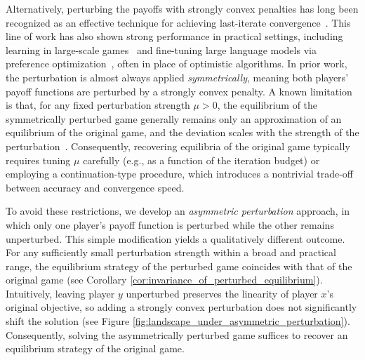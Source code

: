 \documentclass{article}
\theoremstyle{plain}
\begin{document}
Alternatively, perturbing the payoffs with strongly convex penalties \citep{facchinei2003finite} has long been recognized as an effective technique for achieving last-iterate convergence~\citep{koshal2010single,tatarenko2019learning}.
This line of work has also shown strong performance in practical settings, including learning in large-scale games~\citep{bakhtin2022mastering} and fine-tuning large language models via preference optimization~\citep{ye2024online}, often in place of optimistic algorithms.
In prior work, the perturbation is almost always applied \emph{symmetrically}, meaning both players’ payoff functions are perturbed by a strongly convex penalty.
A known limitation is that, for any fixed perturbation strength $\mu>0$, the equilibrium of the symmetrically perturbed game generally remains only an approximation of an equilibrium of the original game, and the deviation scales with the strength of the perturbation~\citep{liu2022power,abe2024slingshot}.
Consequently, recovering equilibria of the original game typically requires tuning $\mu$ carefully (e.g., as a function of the iteration budget) or employing a continuation-type procedure, which introduces a nontrivial trade-off between accuracy and convergence speed.

To avoid these restrictions, we develop an \emph{asymmetric perturbation} approach, in which only one player's payoff function is perturbed while the other remains unperturbed.
This simple modification yields a qualitatively different outcome.
For any sufficiently small perturbation strength within a broad and practical range, the equilibrium strategy of the perturbed game coincides with that of the original game (see Corollary \ref{cor:invariance_of_perturbed_equilibrium}).
Intuitively, leaving player $y$ unperturbed preserves the linearity of player $x$'s original objective, so adding a strongly convex perturbation does not significantly shift the solution (see Figure \ref{fig:landscape_under_asymmetric_perturbation}).
Consequently, solving the asymmetrically perturbed game suffices to recover an equilibrium strategy of the original game.
\end{document}
